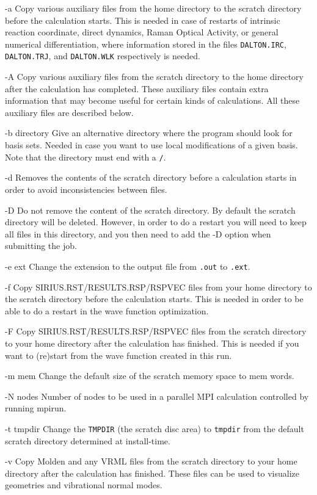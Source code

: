 \begin{list}{--}{}
\item[-a] Copy various auxiliary files from the
home directory to the scratch directory before the calculation
starts. This is needed in case of restarts of intrinsic reaction
coordinate, direct dynamics, Raman Optical Activity, or general
numerical differentiation, where information stored in the files
\verb|DALTON.IRC|, \verb|DALTON.TRJ|, and \verb|DALTON.WLK|
respectively is needed.
\item[-A] Copy various auxiliary files from
the scratch directory to the home directory after the calculation
has completed. These auxiliary files contain extra information
that may become useful for certain kinds of calculations. All
these auxiliary files are described below.
\item[-b directory] Give an alternative directory where the program
should look for basis sets. Needed in case you want to use local
modifications of a given basis. Note that the directory must end with
a \verb|/|.
\item[-d] Removes the contents of the scratch directory before a
calculation starts in order to avoid inconsistencies between files.
\item[-D] Do not remove the content of the scratch directory. By
default the scratch directory will be deleted. However, in order to do
a restart you will need to keep all files in this directory, and you
then need to add the -D option when submitting the job.
\item[-e ext] Change the extension to the output file from \verb|.out|
to \verb|.ext|.
\item[-f] Copy SIRIUS.RST/RESULTS.RSP/RSPVEC
files from your home directory to the scratch directory before the
calculation starts. This is needed in order to be able to do a restart
in the wave function optimization.
\item[-F] Copy SIRIUS.RST/RESULTS.RSP/RSPVEC
files from the
scratch directory to your home directory after the calculation has
finished. This is needed if you want to (re)start
from the wave function created in this run.
\item[-m mem] Change the default size of the scratch
memory space to
mem words.
\item[-N nodes] Number of nodes to be used in a parallel MPI calculation
controlled by running mpirun.
\item[-t tmpdir] Change the \verb|TMPDIR| (the scratch disc area) to
\verb|tmpdir| from the default scratch directory determined at
install-time.
\item[-v] Copy Molden and any VRML files from the scratch directory to
your home directory after the calculation has finished. These files
can be used to visualize geometries and vibrational normal modes.
\end{list}

